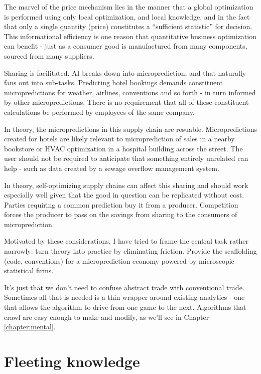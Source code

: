 The marvel of the price mechanism lies in the manner that a global optimization is performed using only local optimization, and local knowledge, and in the fact that only a single quantity (price) constitutes a ``sufficient statistic'' for decision. This informational efficiency is one reason that quantitative business optimization can benefit - just as a consumer good is manufactured from many components, sourced from many suppliers. 

Sharing is facilitated. AI breaks down into microprediction, and that naturally fans out into sub-tasks. Predicting hotel bookings demands constituent micropredictions for weather, airlines, conventions and so forth - in turn informed by other micropredictions. There is no requirement that all of these constituent calculations be performed by employees of the same company. 


In theory, the micropredictions in this supply chain are resuable. Micropredictions created for hotels are likely relevant to microprediction of sales in a nearby bookstore or HVAC optimization in a hospital building across the street. The user should not be required to anticipate that something entirely unrelated can help - such as data created by a sewage overflow management system.  

In theory, self-optimizing supply chains can affect this sharing and should work especially well given that the good in question can be replicated without cost. Parties requiring a common prediction buy it from a producer. Competition forces the producer to pass on the savings from sharing to the consumers of microprediction.  

Motivated by these considerations, I have tried to frame the central task rather narrowly: turn theory into practice by eliminating friction. Provide the scaffolding (code, conventions) for a microprediction economy powered by microscopic statistical firms. 

It's just that we don't need to confuse abstract trade with conventional trade. Sometimes all that is needed is a thin wrapper around existing analytics - one that allows the algorithm to drive from one game to the next. Algorithms that crawl are easy enough to make and modify, as we'll see in Chapter \ref{chapter:mental}. 


\section{Fleeting knowledge}

